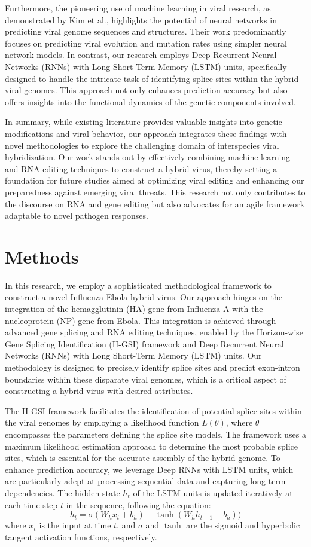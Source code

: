 \documentclass{article}
\begin{document}
Furthermore, the pioneering use of machine learning in viral research, as demonstrated by Kim et al., highlights the potential of neural networks in predicting viral genome sequences and structures. Their work predominantly focuses on predicting viral evolution and mutation rates using simpler neural network models. In contrast, our research employs Deep Recurrent Neural Networks (RNNs) with Long Short-Term Memory (LSTM) units, specifically designed to handle the intricate task of identifying splice sites within the hybrid viral genomes. This approach not only enhances prediction accuracy but also offers insights into the functional dynamics of the genetic components involved.

In summary, while existing literature provides valuable insights into genetic modifications and viral behavior, our approach integrates these findings with novel methodologies to explore the challenging domain of interspecies viral hybridization. Our work stands out by effectively combining machine learning and RNA editing techniques to construct a hybrid virus, thereby setting a foundation for future studies aimed at optimizing viral editing and enhancing our preparedness against emerging viral threats. This research not only contributes to the discourse on RNA and gene editing but also advocates for an agile framework adaptable to novel pathogen responses.

\section{Methods}
In this research, we employ a sophisticated methodological framework to construct a novel Influenza-Ebola hybrid virus. Our approach hinges on the integration of the hemagglutinin (HA) gene from Influenza A with the nucleoprotein (NP) gene from Ebola. This integration is achieved through advanced gene splicing and RNA editing techniques, enabled by the Horizon-wise Gene Splicing Identification (H-GSI) framework and Deep Recurrent Neural Networks (RNNs) with Long Short-Term Memory (LSTM) units. Our methodology is designed to precisely identify splice sites and predict exon-intron boundaries within these disparate viral genomes, which is a critical aspect of constructing a hybrid virus with desired attributes.

The H-GSI framework facilitates the identification of potential splice sites within the viral genomes by employing a likelihood function \( L(\theta) \), where \( \theta \) encompasses the parameters defining the splice site models. The framework uses a maximum likelihood estimation approach to determine the most probable splice sites, which is essential for the accurate assembly of the hybrid genome. To enhance prediction accuracy, we leverage Deep RNNs with LSTM units, which are particularly adept at processing sequential data and capturing long-term dependencies. The hidden state \( h_t \) of the LSTM units is updated iteratively at each time step \( t \) in the sequence, following the equation:
\[ h_t = \sigma(W_h x_t + b_h) + \tanh(W_h h_{t-1} + b_h)) \]
where \( x_t \) is the input at time \( t \), and \( \sigma \) and \( \tanh \) are the sigmoid and hyperbolic tangent activation functions, respectively.
\end{document}
